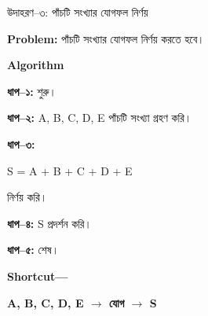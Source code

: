 \begin{examplebox}{উদাহরণ–৩: পাঁচটি সংখ্যার যোগফল নির্ণয়}

\textbf{Problem:}
পাঁচটি সংখ্যার যোগফল নির্ণয় করতে হবে।

\medskip

\textbf{\color{darkTeal}Algorithm}

\textbf{ধাপ–১:} শুরু।

\textbf{ধাপ–২:}
\textenglish{\ttfamily A, B, C, D, E}
পাঁচটি সংখ্যা গ্রহণ করি।

\textbf{ধাপ–৩:}

\begin{center}

\textenglish{\ttfamily S = A + B + C + D + E}
\end{center}

নির্ণয় করি।

\textbf{ধাপ–৪:}
\textenglish{\ttfamily S} প্রদর্শন করি।

\textbf{ধাপ–৫:} শেষ।

\medskip

\textbf{Shortcut—}

\begin{center}

\textbf{
A, B, C, D, E
\(\longrightarrow\)
যোগ
\(\longrightarrow\)
S
}

\end{center}

\end{examplebox}

